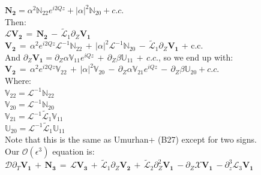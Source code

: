 \documentclass[letterpaper,12pt]{article}
\begin{document}
$\mathbf{N_2} = \alpha^2\mathbb{N}_{22} e^{i2Qz} + \left|\alpha\right|^2 \mathbb{N}_{20} + c.c.$ \\

Then: \\

$\mathcal{L}\mathbf{V_2} \, = \, \mathbf{N_2} \, - \, \widetilde{\mathcal{L}}_1 \partial_Z \mathbf{V_1}$ \\

$\mathbf{V_2} \, = \, \alpha^2 e^{i2Qz} \mathcal{L}^{-1}\mathbb{N}_{22} \, + \,  \left|\alpha\right|^2 \mathcal{L}^{-1} \mathbb{N}_{20}\, - \, \widetilde{\mathcal{L}}_1 \partial_Z \mathbf{V_1}$ + c.c.\\

And $\partial_Z \mathbf{V_1} = \partial_Z \alpha \mathbb{V}_{11} e^{i Q z} \, + \, \partial_Z \beta \mathbb{U}_{11} \, + \, c.c.$, so we end up with: \\

$\mathbf{V_2} \, = \, \alpha^2 e^{i2Qz} \mathbb{V}_{22} \, + \, \left|\alpha\right|^2 \mathbb{V}_{20} \, - \, \partial_Z \alpha \mathbb{V}_{21} e^{iQz} \, - \, \partial_Z \beta \mathbb{U}_{20} + c.c.$ \\

Where: \\

$\mathbb{V}_{22} = \mathcal{L}^{-1}\mathbb{N}_{22}$ \\

$\mathbb{V}_{20} = \mathcal{L}^{-1} \mathbb{N}_{20}$ \\

$\mathbb{V}_{21} = \mathcal{L}^{-1} \widetilde{\mathcal{L}}_1 \mathbb{V}_{11}$ \\

$\mathbb{U}_{20} = \mathcal{L}^{-1} \widetilde{\mathcal{L}}_1 \mathbb{U}_{11}$ \\

Note that this is the same as Umurhan+ (B27) except for two signs. \\

Our $\mathcal{O}(\epsilon^3)$ equation is: \\

$\mathcal{D}\partial_T \mathbf{V_1} \, + \, \mathbf{N_3} \, = \, \mathcal{L} \mathbf{V_3} \, + \, \widetilde{\mathcal{L}}_1\partial_Z\mathbf{V_2} \, + \, \widetilde{\mathcal{L}}_2\partial_Z^2\mathbf{V_1} \, - \partial_Z\mathcal{X}\mathbf{V_1} \, - \partial_z^3\mathcal{L}_3\mathbf{V_1}$ \\
\end{document}
